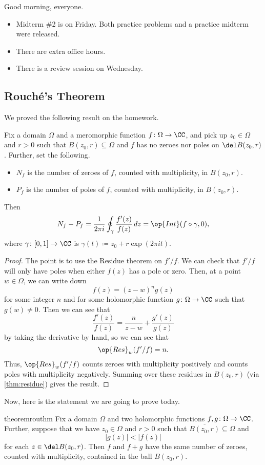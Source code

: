 \documentclass[../notes.tex]{subfiles}
\begin{document}

Good morning, everyone.
\begin{itemize}
	\item Midterm \#2 is on Friday. Both practice problems and a practice midterm were released.
	\item There are extra office hours.
	\item There is a review session on Wednesday.
\end{itemize}

\subsection{Rouch\'e's Theorem}
We proved the following result on the homework.
\begin{theorem} \label{thm:argpri}
	Fix a domain $\Omega$ and a meromorphic function $f\colon \Omega\to\CC$, and pick up $z_0\in\Omega$ and $r>0$ such that $B(z_0,r)\subseteq\Omega$ and $f$ has no zeroes nor poles on $\del B(z_0,r)$. Further, set the following.
	\begin{itemize}
		\item $N_f$ is the number of zeroes of $f$, counted with multiplicity, in $B(z_0,r)$.
		\item $P_f$ is the number of poles of $f$, counted with multiplicity, in $B(z_0,r)$.
	\end{itemize}
	Then
	\[N_f-P_f=\frac1{2\pi i}\oint_\gamma\frac{f'(z)}{f(z)}\,dz=\op{Int}(f\circ\gamma,0),\]
	where $\gamma\colon [0,1]\to\CC$ is $\gamma(t)\coloneqq z_0+r\exp(2\pi it)$.
\end{theorem}
\begin{proof}
	The point is to use the Residue theorem on $f'/f$. We can check that $f'/f$ will only have poles when either $f(z)$ has a pole or zero. Then, at a point $w\in\Omega$, we can write down
	\[f(z)=(z-w)^ng(z)\]
	for some integer $n$ and for some holomorphic function $g\colon \Omega\to\CC$ such that $g(w)\ne0$. Then we can see that
	\[\frac{f'(z)}{f(z)}=\frac n{z-w}+\frac{g'(z)}{g(z)}\]
	by taking the derivative by hand, so we can see that
	\[\op{Res}_w(f'/f)=n.\]
	Thus, $\op{Res}_w(f'/f)$ counts zeroes with multiplicity positively and counts poles with multiplicity negatively. Summing over these residues in $B(z_0,r)$ (via \autoref{thm:residue}) gives the result.
\end{proof}
Now, here is the statement we are going to prove today.
\begin{restatable}[Rouch\'e's]{theorem}{routhm} \label{thm:rou}
	Fix a domain $\Omega$ and two holomorphic functions $f,g\colon \Omega\to\CC$. Further, suppose that we have $z_0\in\Omega$ and $r>0$ such that $\overline{B(z_0,r)}\subseteq\Omega$ and
	\[|g(z)|<|f(z)|\]
	for each $z\in\del B(z_0,r)$. Then $f$ and $f+g$ have the same number of zeroes, counted with multiplicity, contained in the ball $B(z_0,r)$.
\end{restatable}
\end{document}
